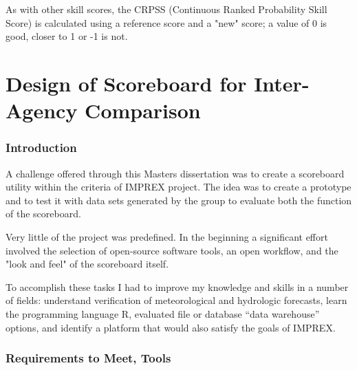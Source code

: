 \documentclass[logos,parttoc,morelanguage=french,morelanguage=german,draft]{orsay-memoire}
\begin{document}
As with other skill scores, the CRPSS (Continuous Ranked Probability Skill Score) is calculated using a reference score and a "new" score; a value of 0 is good, closer to 1 or -1 is not.


\part{Design of Scoreboard for Inter-Agency Comparison}

\section{Introduction} 

A challenge offered through this Masters dissertation was to create a scoreboard utility within the criteria of IMPREX project. The idea was to create a prototype and to test it with data sets generated by the group to evaluate both the function of the scoreboard.

Very little of the project was predefined. In the beginning a significant effort involved the selection of open-source software tools, an open workflow, and the "look and feel" of the scoreboard itself.

To accomplish these tasks I had to improve my knowledge and skills in a number of fields: understand verification of meteorological and hydrologic forecasts, learn the programming language R, evaluated file or database ``data warehouse'' options, and identify a platform that would also satisfy the goals of IMPREX.

\section{Requirements to Meet, Tools}
\end{document}
